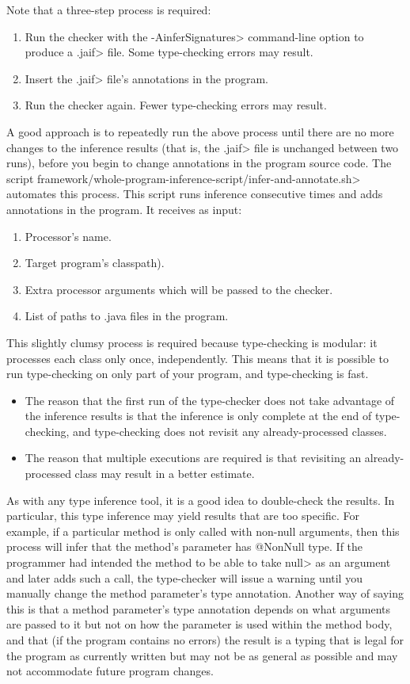 Note that a three-step process is required:
\begin{enumerate}
\item Run the checker with the \<-AinferSignatures> command-line option to
  produce a \<.jaif> file.  Some type-checking errors may result.
\item Insert the \<.jaif> file's annotations in the program.
\item Run the checker again.  Fewer type-checking errors may result.
\end{enumerate}
\noindent
A good approach is to repeatedly run the above process until there are no
more changes to the inference results (that is, the \<.jaif> file is
unchanged between two runs), before you begin to change annotations in the
program source code.
The script \<framework/whole-program-inference-script/infer-and-annotate.sh>
automates this process. This script runs inference consecutive times and adds
annotations in the program. It receives as input:
\begin{enumerate}
\item Processor's name.
\item Target program's classpath).
\item Extra processor arguments which will be passed to the checker.
\item List of paths to .java files in the program.
\end{enumerate}

This slightly clumsy process is required because type-checking is modular:
it processes each class only once, independently.  This means that it is
possible to run type-checking on only part of your program, and
type-checking is fast.
\begin{itemize}
\item
  The reason that the first run of the type-checker does not take advantage
  of the inference results is that the inference is only complete at the
  end of type-checking, and type-checking does not revisit any
  already-processed classes.
\item
  The reason that multiple executions are required is that revisiting an
  already-processed class may result in a better estimate.
\end{itemize}

As with any type inference tool, it is a good idea to double-check the
results.  In particular, this type inference may yield results that are too
specific.  For example, if a particular method is only called with non-null
arguments, then this process will infer that the method's parameter has
@NonNull type.  If the programmer had intended the method to be able to
take \<null> as an argument and later adds such a call, the type-checker
will issue a warning until you manually change the method parameter's type
annotation.  Another way of saying this is that a method parameter's type
annotation depends on what arguments are passed to it but not on how the
parameter is used within the method body, and that (if the program contains
no errors) the result is a typing that is legal for the program as
currently written but may not be as general as possible and may not
accommodate future program changes.

